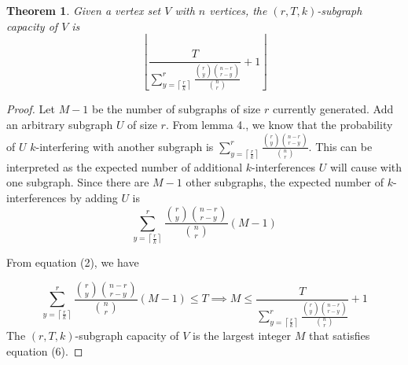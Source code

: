 \documentclass[10pt]{extarticle}
\newtheorem{theorem}{Theorem}
\theoremstyle{definition}
\begin{document}
\begin{theorem}
    Given a vertex set $V$ with $n$ vertices, the $(r,T,k)$-subgraph capacity of $V$ is 
    \begin{equation*}
        \left\lfloor \frac{T}{\sum_{y = \left\lceil \frac{r}{k} \right\rceil}^{r}  \frac{\binom{r}{y} \binom{n-r}{r-y}}{\binom{n}{r}}} + 1 \right\rfloor
    \end{equation*}
\end{theorem}
\begin{proof}
    Let $M-1$ be the number of subgraphs of size $r$ currently generated. Add an arbitrary subgraph $U$ of size $r$. From lemma 4., we know that the probability of $U$ $k$-interfering with another subgraph is $\sum_{y = \left\lceil \frac{r}{k} \right\rceil}^{r}  \frac{\binom{r}{y} \binom{n-r}{r-y}}{\binom{n}{r}}$. This can be interpreted as the expected number of additional $k$-interferences $U$ will cause with one subgraph. Since there are $M-1$ other subgraphs, the expected number of $k$-interferences by adding $U$ is 
    \begin{equation}
        \sum_{y = \left\lceil \frac{r}{k} \right\rceil}^{r}  \frac{\binom{r}{y} \binom{n-r}{r-y}}{\binom{n}{r}} (M-1)
    \end{equation}

    From equation (2), we have 

    \begin{equation}
        \sum_{y = \left\lceil \frac{r}{k} \right\rceil}^{r}  \frac{\binom{r}{y} \binom{n-r}{r-y}}{\binom{n}{r}} (M-1) \le T \implies M \le \frac{T}{\sum_{y = \left\lceil \frac{r}{k} \right\rceil}^{r}  \frac{\binom{r}{y} \binom{n-r}{r-y}}{\binom{n}{r}}} + 1
    \end{equation}
    The $(r,T,k)$-subgraph capacity of $V$ is the largest integer $M$ that satisfies equation (6).
\end{proof}
\end{document}
